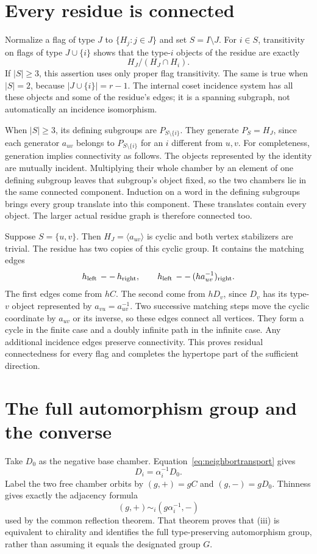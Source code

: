 \section{Every residue is connected}
Normalize a flag of type $J$ to $\{H_j:j\in J\}$ and set $S=I\setminus J$. For $i\in S$, transitivity on flags of type $J\cup\{i\}$ shows that the type-$i$ objects of the residue are exactly
\[
                  H_J/(H_J\cap H_i).
\]
If $|S|\geq3$, this assertion uses only proper flag transitivity. The same is true when $|S|=2$, because $|J\cup\{i\}|=r-1$. The internal coset incidence system has all these objects and some of the residue's edges; it is a spanning subgraph, not automatically an incidence isomorphism.

When $|S|\geq3$, its defining subgroups are $P_{S\setminus\{i\}}$. They generate $P_S=H_J$, since each generator $a_{uv}$ belongs to $P_{S\setminus\{i\}}$ for an $i$ different from $u,v$. For completeness, generation implies connectivity as follows. The objects represented by the identity are mutually incident. Multiplying their whole chamber by an element of one defining subgroup leaves that subgroup's object fixed, so the two chambers lie in the same connected component. Induction on a word in the defining subgroups brings every group translate into this component. These translates contain every object. The larger actual residue graph is therefore connected too.

Suppose $S=\{u,v\}$. Then $H_J=\langle a_{uv}\rangle$ is cyclic and both vertex stabilizers are trivial. The residue has two copies of this cyclic group. It contains the matching edges
\[
        h_{\rm left}\,--\,h_{\rm right},\qquad
        h_{\rm left}\,--\,(h a_{uv}^{-1})_{\rm right}.
\]
The first edges come from $hC$. The second come from $hD_v$, since $D_v$ has its type-$v$ object represented by $a_{vu}=a_{uv}^{-1}$. Two successive matching steps move the cyclic coordinate by $a_{uv}$ or its inverse, so these edges connect all vertices. They form a cycle in the finite case and a doubly infinite path in the infinite case. Any additional incidence edges preserve connectivity. This proves residual connectedness for every flag and completes the hypertope part of the sufficient direction.

\section{The full automorphism group and the converse}
Take $D_0$ as the negative base chamber. Equation~\eqref{eq:neighbortransport} gives
\[
                         D_i=\alpha_i^{-1}D_0.
\]
Label the two free chamber orbits by $(g,+)=gC$ and $(g,-)=gD_0$. Thinness gives exactly the adjacency formula
\[
                   (g,+)\sim_i(g\alpha_i^{-1},-)
\]
used by the common reflection theorem. That theorem proves that (iii) is equivalent to chirality and identifies the full type-preserving automorphism group, rather than assuming it equals the designated group $G$.

